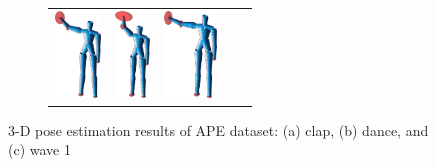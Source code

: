 \begin{figure}
\begin{subfigure}[b]{1\linewidth}
\begin{tabular}{c|cccc}
			\includegraphics[height=2.3cm]{fig/body/APE/wave12.png} &
			\includegraphics[height=2.3cm]{fig/body/APE/wave13.png} & 
			\includegraphics[height=2.3cm]{fig/body/APE/wave14.png} 
		\end{tabular}
		\label{fig/body/APE/wave1} 
	\end{subfigure}
	\caption{3-D pose estimation results of APE dataset: (a) clap, (b) dance, and (c) wave 1}
	\label{fig/body/APE2}
\end{figure}

